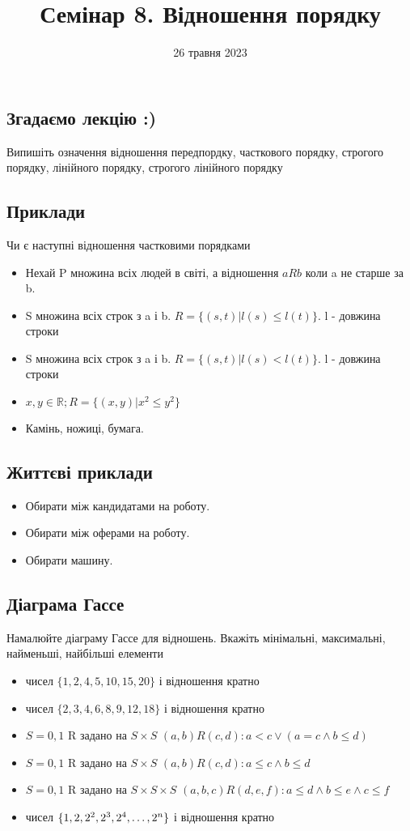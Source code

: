 \documentclass{article}
\begin{document}
\title{Семінар 8. Відношення порядку}
\date{26 травня 2023}

\maketitle

\subsection*{Згадаємо лекцію :)}
Випишіть означення відношення передпордку, часткового порядку, строгого порядку, лінійного порядку, строгого лінійного порядку

\subsection*{Приклади}
Чи є наступні відношення частковими порядками
\begin{itemize}
    \item Нехай P множина всіх людей в світі, а відношення $aRb$ коли a не старше за b.
    \item S множина всіх строк з a і b. $R=\{(s,t)|l(s) \leq l(t)\}$. l - довжина строки
    \item S множина всіх строк з a і b. $R=\{(s,t)|l(s) < l(t)\}$. l - довжина строки
    \item $x,y \in \mathbb{R}; R = \{(x,y)|x^2 \leq y^2\}$
    \item Камінь, ножиці, бумага.
\end{itemize}

\subsection*{Життєві приклади}
\begin{itemize}
    \item Обирати між кандидатами на роботу.
    \item Обирати між оферами на роботу.
    \item Обирати машину.
\end{itemize}

\subsection*{Діаграма Гассе}
Намалюйте діаграму Гассе для відношень. Вкажіть мінімальні, максимальні, найменьші, найбільші елементи
\begin{itemize}
    \item чисел $\{1,2,4,5,10,15,20\}$ і відношення кратно
    \item чисел $\{2,3,4,6,8,9,12,18\}$ і відношення кратно
    \item $S={0,1}$ R задано на $S \times S$ $(a,b)R(c,d): a < c \lor (a=c \land b \leq d)$
    \item $S={0,1}$ R задано на $S \times S$ $(a,b)R(c,d): a\leq c \land b \leq d$
    \item $S={0,1}$ R задано на $S \times S \times S$ $(a,b,c)R(d,e,f): a\leq d \land b \leq e \land c \leq f$
    \item чисел $\{1,2,2^2,2^3,2^4,\mathellipsis,2^n\}$ і відношення кратно
\end{itemize}
\end{document}
